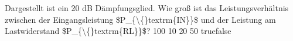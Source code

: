     {Dargestellt ist ein 20 dB Dämpfungsglied. Wie groß ist das Leistungsverhältnis zwischen der Eingangsleistung \$P\_\{\textbackslash\{\}textrm\{IN\}\}\$ und der Leistung am Lastwiderstand \$P\_\{\textbackslash\{\}textrm\{RL\}\}\$?}
    {100}
    {10}
    {20}
    {50}
    {true}{false}